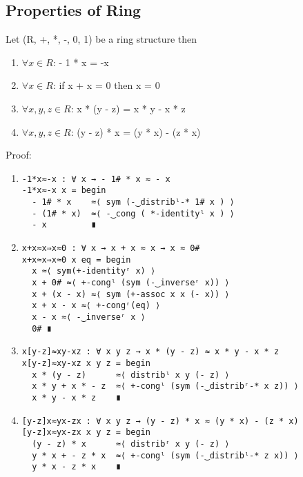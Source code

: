 \subsection{Properties of Ring}
Let (R, +, *, -, 0, 1) be a ring structure then
\begin{enumerate}
\item \(\forall x \in R\): - 1 * x = -x
\item \(\forall x \in R\): if x + x = 0 then x = 0
\item \(\forall x,y,z \in R\): x * (y - z) = x * y - x * z
\item \(\forall x,y,z \in R\): (y - z) * x = (y * x) - (z * x)
\end{enumerate}
Proof:
\begin{enumerate}
\item
\begin{Verbatim}
-1*x≈-x : ∀ x → - 1# * x ≈ - x
-1*x≈-x x = begin
  - 1# * x    ≈⟨ sym (-‿distribˡ-* 1# x ) ⟩
  - (1# * x)  ≈⟨ -‿cong ( *-identityˡ x ) ⟩
  - x         ∎
\end{Verbatim}
\item
\begin{Verbatim}
x+x≈x⇒x≈0 : ∀ x → x + x ≈ x → x ≈ 0#
x+x≈x⇒x≈0 x eq = begin
  x ≈⟨ sym(+-identityʳ x) ⟩
  x + 0# ≈⟨ +-congˡ (sym (-‿inverseʳ x)) ⟩
  x + (x - x) ≈⟨ sym (+-assoc x x (- x)) ⟩
  x + x - x ≈⟨ +-congʳ(eq) ⟩
  x - x ≈⟨ -‿inverseʳ x ⟩
  0# ∎
\end{Verbatim}
\item
\begin{Verbatim}
x[y-z]≈xy-xz : ∀ x y z → x * (y - z) ≈ x * y - x * z
x[y-z]≈xy-xz x y z = begin
  x * (y - z)      ≈⟨ distribˡ x y (- z) ⟩
  x * y + x * - z  ≈⟨ +-congˡ (sym (-‿distribʳ-* x z)) ⟩
  x * y - x * z    ∎
\end{Verbatim}
\item
\begin{Verbatim}
[y-z]x≈yx-zx : ∀ x y z → (y - z) * x ≈ (y * x) - (z * x)
[y-z]x≈yx-zx x y z = begin
  (y - z) * x      ≈⟨ distribʳ x y (- z) ⟩
  y * x + - z * x  ≈⟨ +-congˡ (sym (-‿distribˡ-* z x)) ⟩
  y * x - z * x    ∎
\end{Verbatim}
\end{enumerate}